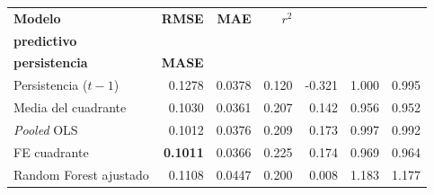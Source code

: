 \begin{tabular}{l r r r r r r}
\toprule
\textbf{Modelo} & \textbf{RMSE} & \textbf{MAE} & \textbf{$r^2$} & \makecell[c]{\textbf{$R^2$}\\\textbf{predictivo}} & \makecell[c]{\textbf{MAE rel.}\\\textbf{persistencia}} & \textbf{MASE} \\
\midrule
Persistencia ($t-1$) & 0.1278 & 0.0378 & 0.120 & -0.321 & 1.000 & 0.995 \\
Media del cuadrante & 0.1030 & 0.0361 & 0.207 & 0.142 & 0.956 & 0.952 \\
\emph{Pooled} OLS & 0.1012 & 0.0376 & 0.209 & 0.173 & 0.997 & 0.992 \\
FE cuadrante & \textbf{0.1011} & 0.0366 & 0.225 & 0.174 & 0.969 & 0.964 \\
Random Forest ajustado & 0.1108 & 0.0447 & 0.200 & 0.008 & 1.183 & 1.177 \\
\bottomrule
\end{tabular}
